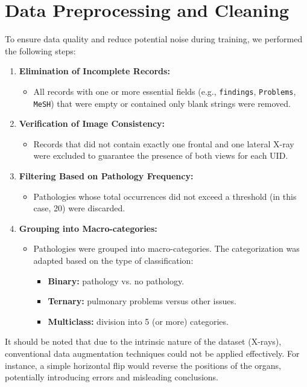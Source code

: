 \documentclass[a4paper,12pt]{article}
\begin{document}
\section{Data Preprocessing and Cleaning}
To ensure data quality and reduce potential noise during training, we performed the following steps:
\begin{enumerate}
    \item \textbf{Elimination of Incomplete Records:}  
    \begin{itemize}
        \item All records with one or more essential fields (e.g., \texttt{findings}, \texttt{Problems}, \texttt{MeSH}) that were empty or contained only blank strings were removed.
    \end{itemize}
    \item \textbf{Verification of Image Consistency:}  
    \begin{itemize}
        \item Records that did not contain exactly one frontal and one lateral X-ray were excluded to guarantee the presence of both views for each UID.
    \end{itemize}
    \item \textbf{Filtering Based on Pathology Frequency:}  
    \begin{itemize}
        \item Pathologies whose total occurrences did not exceed a threshold (in this case, 20) were discarded.
    \end{itemize}
    \item \textbf{Grouping into Macro-categories:}  
    \begin{itemize}
        \item Pathologies were grouped into macro-categories. The categorization was adapted based on the type of classification:
        \begin{itemize}
            \item \textbf{Binary:} pathology vs. no pathology.
            \item \textbf{Ternary:} pulmonary problems versus other issues.
            \item \textbf{Multiclass:} division into 5 (or more) categories.
        \end{itemize}
    \end{itemize}
\end{enumerate}

It should be noted that due to the intrinsic nature of the dataset (X-rays), conventional data augmentation techniques could not be applied effectively. For instance, a simple horizontal flip would reverse the positions of the organs, potentially introducing errors and misleading conclusions.
\end{document}
